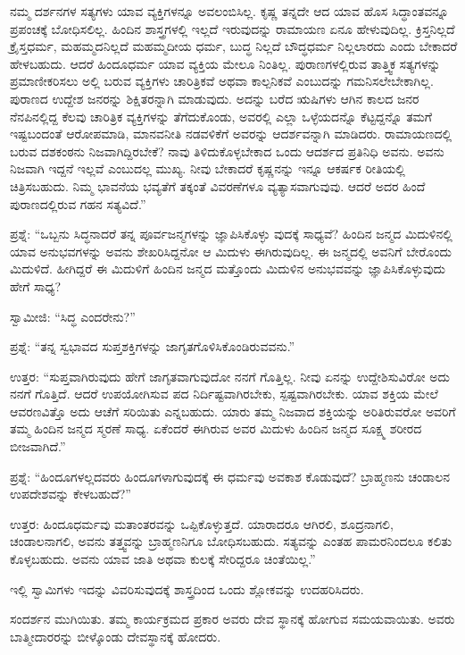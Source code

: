 ನಮ್ಮ ದರ್ಶನಗಳ ಸತ್ಯಗಳು ಯಾವ ವ್ಯಕ್ತಿಗಳನ್ನೂ ಅವಲಂಬಿಸಿಲ್ಲ. ಕೃಷ್ಣ ತನ್ನದೇ ಆದ ಯಾವ ಹೊಸ ಸಿದ್ಧಾಂತವನ್ನೂ ಪ್ರಪಂಚಕ್ಕೆ ಬೋಧಿಸಲಿಲ್ಲ. ಹಿಂದಿನ ಶಾಸ್ತ್ರಗಳಲ್ಲಿ ಇಲ್ಲದೆ ಇರುವುದನ್ನು ರಾಮಾಯಣ ಏನೂ ಹೇಳುವುದಿಲ್ಲ. ಕ್ರಿಸ್ತನಿಲ್ಲದೆ ಕ್ರೈಸ್ತಧರ್ಮ, ಮಹಮ್ಮದನಿಲ್ಲದೆ ಮಹಮ್ಮದೀಯ ಧರ್ಮ, ಬುದ್ಧ ನಿಲ್ಲದೆ ಬೌದ್ಧಧರ್ಮ ನಿಲ್ಲಲಾರದು ಎಂದು ಬೇಕಾದರೆ ಹೇಳಬಹುದು. ಆದರೆ ಹಿಂದೂಧರ್ಮ ಯಾವ ವ್ಯಕ್ತಿಯ ಮೇಲೂ ನಿಂತಿಲ್ಲ. ಪುರಾಣಗಳಲ್ಲಿರುವ ತಾತ್ತ್ವಿಕ ಸತ್ಯಗಳನ್ನು ಪ್ರಮಾಣೀಕರಿಸಲು ಅಲ್ಲಿ ಬರುವ ವ್ಯಕ್ತಿಗಳು ಚಾರಿತ್ರಿಕವೆ ಅಥವಾ ಕಾಲ್ಪನಿಕವೆ ಎಂಬುದನ್ನು ಗಮನಿಸಲೇಬೇಕಾಗಿಲ್ಲ. ಪುರಾಣದ ಉದ್ದೇಶ ಜನರನ್ನು ಶಿಕ್ಷಿತರನ್ನಾಗಿ ಮಾಡುವುದು. ಅದನ್ನು ಬರೆದ ಋಷಿಗಳು ಆಗಿನ ಕಾಲದ ಜನರ ನೆನಪಿನಲ್ಲಿದ್ದ ಕೆಲವು ಚಾರಿತ್ರಿಕ ವ್ಯಕ್ತಿಗಳನ್ನು ತೆಗೆದುಕೊಂಡು, ಅವರಲ್ಲಿ ಎಲ್ಲಾ ಒಳ್ಳೆಯದನ್ನೊ ಕೆಟ್ಟದ್ದನ್ನೊ ತಮಗೆ ಇಷ್ಟಬಂದಂತೆ ಆರೋಪಮಾಡಿ, ಮಾನವನೀತಿ ನಡವಳಿಕೆಗೆ ಅವರನ್ನು ಆದರ್ಶವನ್ನಾಗಿ ಮಾಡಿದರು. ರಾಮಾಯಣದಲ್ಲಿ ಬರುವ ದಶಕಂಠನು ನಿಜವಾಗಿದ್ದಿರಬೇಕೆ? ನಾವು ತಿಳಿದುಕೊಳ್ಳಬೇಕಾದ ಒಂದು ಆದರ್ಶದ ಪ್ರತಿನಿಧಿ ಅವನು. ಅವನು ನಿಜವಾಗಿ ಇದ್ದನೆ ಇಲ್ಲವೆ ಎಂಬುದಲ್ಲ ಮುಖ್ಯ. ನೀವು ಬೇಕಾದರೆ ಕೃಷ್ಣನನ್ನು ಇನ್ನೂ ಆಕರ್ಷಕ ರೀತಿಯಲ್ಲಿ ಚಿತ್ರಿಸಬಹುದು. ನಿಮ್ಮ ಭಾವನೆಯ ಭವ್ಯತೆಗೆ ತಕ್ಕಂತೆ ವಿವರಣೆಗಳೂ ವ್ಯತ್ಯಾಸವಾಗುವುವು. ಆದರೆ ಅದರ ಹಿಂದೆ ಪುರಾಣದಲ್ಲಿರುವ ಗಹನ ಸತ್ಯವಿದೆ.”

ಪ್ರಶ್ನೆ: “ಒಬ್ಬನು ಸಿದ್ಧನಾದರೆ ತನ್ನ ಪೂರ್ವಜನ್ಮಗಳನ್ನು ಜ್ಞಾಪಿಸಿಕೊಳ್ಳು ವುದಕ್ಕೆ ಸಾಧ್ಯವೆ? ಹಿಂದಿನ ಜನ್ಮದ ಮಿದುಳಿನಲ್ಲಿ ಯಾವ ಅನುಭವಗಳನ್ನು ಅವನು ಶೇಖರಿಸಿದ್ದನೋ ಆ ಮಿದುಳು ಈಗಿರುವುದಿಲ್ಲ. ಈ ಜನ್ಮದಲ್ಲಿ ಅವನಿಗೆ ಬೇರೊಂದು ಮಿದುಳಿದೆ. ಹೀಗಿದ್ದರೆ ಈ ಮಿದುಳಿಗೆ ಹಿಂದಿನ ಜನ್ಮದ ಮತ್ತೊಂದು ಮಿದುಳಿನ ಅನುಭವವನ್ನು ಜ್ಞಾಪಿಸಿಕೊಳ್ಳುವುದು ಹೇಗೆ ಸಾಧ್ಯ?

ಸ್ವಾಮೀಜಿ: “ಸಿದ್ಧ ಎಂದರೇನು?”

ಪ್ರಶ್ನೆ: “ತನ್ನ ಸ್ವಭಾವದ ಸುಪ್ತಶಕ್ತಿಗಳನ್ನು ಜಾಗೃತಗೊಳಿಸಿಕೊಂಡಿರುವವನು.”

ಉತ್ತರ: “ಸುಪ್ತವಾಗಿರುವುದು ಹೇಗೆ ಜಾಗೃತವಾಗುವುದೋ ನನಗೆ ಗೊತ್ತಿಲ್ಲ. ನೀವು ಏನನ್ನು ಉದ್ದೇಶಿಸುವಿರೋ ಅದು ನನಗೆ ಗೊತ್ತಿದೆ. ಆದರೆ ಉಪಯೋಗಿಸುವ ಪದ ನಿರ್ದಿಷ್ಟವಾಗಿರಬೇಕು, ಸ್ಪಷ್ಟವಾಗಿರಬೇಕು. ಯಾವ ಶಕ್ತಿಯ ಮೇಲೆ ಆವರಣವಿತ್ತೊ ಅದು ಆಚೆಗೆ ಸರಿಯಿತು ಎನ್ನಬಹುದು. ಯಾರು ತಮ್ಮ ನಿಜವಾದ ಶಕ್ತಿಯನ್ನು ಅರಿತಿರುವರೋ ಅವರಿಗೆ ತಮ್ಮ ಹಿಂದಿನ ಜನ್ಮದ ಸ್ಮರಣೆ ಸಾಧ್ಯ. ಏಕೆಂದರೆ ಈಗಿರುವ ಅವರ ಮಿದುಳು ಹಿಂದಿನ ಜನ್ಮದ ಸೂಕ್ಷ್ಮ ಶರೀರದ ಬೀಜವಾಗಿದೆ.”

ಪ್ರಶ್ನೆ: “ಹಿಂದೂಗಳಲ್ಲದವರು ಹಿಂದೂಗಳಾಗುವುದಕ್ಕೆ ಈ ಧರ್ಮವು ಅವಕಾಶ ಕೊಡುವುದೆ? ಬ್ರಾಹ್ಮಣನು ಚಂಡಾಲನ ಉಪದೇಶವನ್ನು ಕೇಳಬಹುದೆ?”

ಉತ್ತರ: ಹಿಂದೂಧರ್ಮವು ಮತಾಂತರವನ್ನು ಒಪ್ಪಿಕೊಳ್ಳುತ್ತದೆ. ಯಾರಾದರೂ ಆಗಿರಲಿ, ಶೂದ್ರನಾಗಲಿ, ಚಂಡಾಲನಾಗಲಿ, ಅವನು ತತ್ತ್ವವನ್ನು ಬ್ರಾಹ್ಮಣನಿಗೂ ಬೋಧಿಸಬಹುದು. ಸತ್ಯವನ್ನು ಎಂತಹ ಪಾಮರನಿಂದಲೂ ಕಲಿತು ಕೊಳ್ಳಬಹುದು. ಅವನು ಯಾವ ಜಾತಿ ಅಥವಾ ಕುಲಕ್ಕೆ ಸೇರಿದ್ದರೂ ಚಿಂತೆಯಿಲ್ಲ.”

ಇಲ್ಲಿ ಸ್ವಾಮಿಗಳು ಇದನ್ನು ವಿವರಿಸುವುದಕ್ಕೆ ಶಾಸ್ತ್ರದಿಂದ ಒಂದು ಶ್ಲೋಕವನ್ನು ಉದಹರಿಸಿದರು.

ಸಂದರ್ಶನ ಮುಗಿಯಿತು. ತಮ್ಮ ಕಾರ್ಯಕ್ರಮದ ಪ್ರಕಾರ ಅವರು ದೇವ ಸ್ಥಾನಕ್ಕೆ ಹೋಗುವ ಸಮಯವಾಯಿತು. ಅವರು ಬಾತ್ಮೀದಾರರನ್ನು ಬೀಳ್ಕೊಂಡು ದೇವಸ್ಥಾನಕ್ಕೆ ಹೋದರು.

